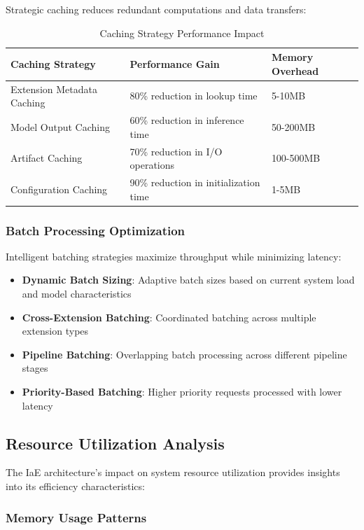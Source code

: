 Strategic caching reduces redundant computations and data transfers:

\begin{table}[ht]
\centering
\begin{tabular}{@{}lll@{}}
\toprule
\textbf{Caching Strategy} & \textbf{Performance Gain} & \textbf{Memory Overhead} \\
\midrule
Extension Metadata Caching & 80\% reduction in lookup time & 5-10MB \\
Model Output Caching & 60\% reduction in inference time & 50-200MB \\
Artifact Caching & 70\% reduction in I/O operations & 100-500MB \\
Configuration Caching & 90\% reduction in initialization time & 1-5MB \\
\bottomrule
\end{tabular}
\caption{Caching Strategy Performance Impact}
\label{tab:caching-performance}
\end{table}

\subsubsection{Batch Processing Optimization}

Intelligent batching strategies maximize throughput while minimizing latency:

\begin{itemize}
    \item \textbf{Dynamic Batch Sizing}: Adaptive batch sizes based on current system load and model characteristics
    \item \textbf{Cross-Extension Batching}: Coordinated batching across multiple extension types
    \item \textbf{Pipeline Batching}: Overlapping batch processing across different pipeline stages
    \item \textbf{Priority-Based Batching}: Higher priority requests processed with lower latency
\end{itemize}

\subsection{Resource Utilization Analysis}

The IaE architecture's impact on system resource utilization provides insights into its efficiency characteristics:

\subsubsection{Memory Usage Patterns}

